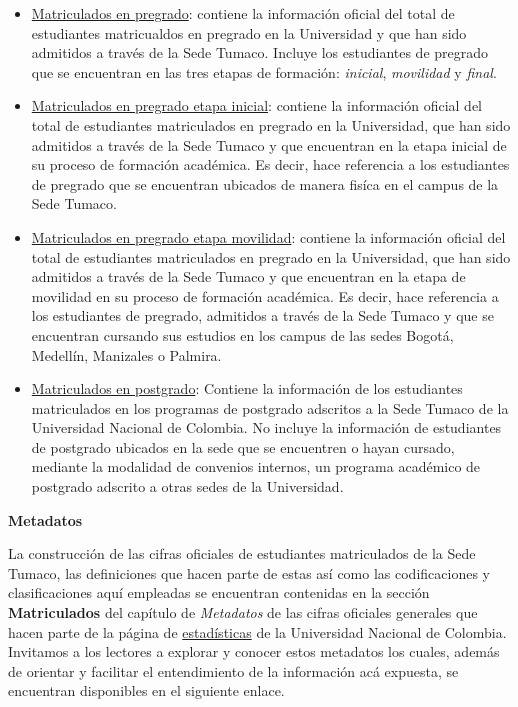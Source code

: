 \documentclass[
]{book}
\begin{document}
\begin{itemize}
\item
  \protect\hyperlink{MatPre}{Matriculados en pregrado}: contiene la información oficial del total de estudiantes matricualdos en pregrado en la Universidad y que han sido admitidos a través de la Sede Tumaco. Incluye los estudiantes de pregrado que se encuentran en las tres etapas de formación: \emph{inicial}, \emph{movilidad} y \emph{final}.
\item
  \protect\hyperlink{MatPreIni}{Matriculados en pregrado etapa inicial}: contiene la información oficial del total de estudiantes matriculados en pregrado en la Universidad, que han sido admitidos a través de la Sede Tumaco y que encuentran en la etapa inicial de su proceso de formación académica. Es decir, hace referencia a los estudiantes de pregrado que se encuentran ubicados de manera fisíca en el campus de la Sede Tumaco.
\item
  \protect\hyperlink{MatPreMov}{Matriculados en pregrado etapa movilidad}: contiene la información oficial del total de estudiantes matriculados en pregrado en la Universidad, que han sido admitidos a través de la Sede Tumaco y que encuentran en la etapa de movilidad en su proceso de formación académica. Es decir, hace referencia a los estudiantes de pregrado, admitidos a través de la Sede Tumaco y que se encuentran cursando sus estudios en los campus de las sedes Bogotá, Medellín, Manizales o Palmira.
\item
  \protect\hyperlink{MatPos}{Matriculados en postgrado}: Contiene la información de los estudiantes matriculados en los programas de postgrado adscritos a la Sede Tumaco de la Universidad Nacional de Colombia. No incluye la información de estudiantes de postgrado ubicados en la sede que se encuentren o hayan cursado, mediante la modalidad de convenios internos, un programa académico de postgrado adscrito a otras sedes de la Universidad.
\end{itemize}

\textbf{Metadatos}

La construcción de las cifras oficiales de estudiantes matriculados de la Sede Tumaco, las definiciones que hacen parte de estas así como las codificaciones y clasificaciones aquí empleadas se encuentran contenidas en la sección \textbf{Matriculados} del capítulo de \emph{Metadatos} de las cifras oficiales generales que hacen parte de la página de \href{http://estadisticas.unal.edu.co/home/}{estadísticas} de la Universidad Nacional de Colombia. Invitamos a los lectores a explorar y conocer estos metadatos los cuales, además de orientar y facilitar el entendimiento de la información acá expuesta, se encuentran disponibles en el siguiente enlace.
\end{document}
